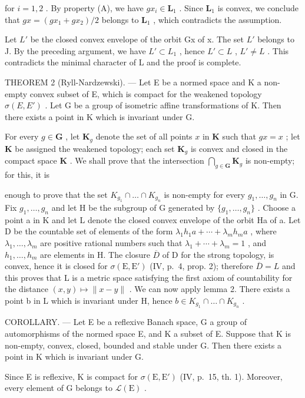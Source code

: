 for \(i = 1, 2\) . By property (A), we have \(gx_{i} \in \mathbf{L}_{1}\) . Since \(\mathbf{L}_{1}\) is convex, we conclude that \(gx = (gx_{1} + gx_{2}) / 2\) belongs to \(\mathbf{L}_{1}\) , which contradicts the assumption.

Let \(L'\) be the closed convex envelope of the orbit Gx of x. The set \(L'\) belongs to J. By the preceding argument, we have \(L' \subset L_1\) , hence \(L' \subset L\) , \(L' \neq L\) . This contradicts the minimal character of L and the proof is complete.

THEOREM 2 (Ryll-Nardzewski). --- Let E be a normed space and K a non-empty convex subset of E, which is compact for the weakened topology \(\sigma(E, E')\) . Let G be a group of isometric affine transformations of K. Then there exists a point in K which is invariant under G.

For every \(g \in \mathbf{G}\) , let \(\mathbf{K}_g\) denote the set of all points \(x\) in \(\mathbf{K}\) such that \(gx = x\) ; let \(\mathbf{K}\) be assigned the weakened topology; each set \(\mathbf{K}_g\) is convex and closed in the compact space \(\mathbf{K}\) . We shall prove that the intersection \(\bigcap_{g \in \mathbf{G}} \mathbf{K}_g\) is non-empty; for this, it is

enough to prove that the set \(K_{g_{1}} \cap \ldots \cap K_{g_{n}}\) is non-empty for every \(g_{1}, \ldots, g_{n}\) in G. Fix \(g_{1}, \ldots, g_{n}\) and let H be the subgroup of G generated by \(\{g_{1}, \ldots, g_{n}\}\) . Choose a point a in K and let L denote the closed convex envelope of the orbit Ha of a. Let D be the countable set of elements of the form \(\lambda_{1}h_{1}a + \cdots + \lambda_{m}h_{m}a\) , where \(\lambda_{1}, \ldots, \lambda_{m}\) are positive rational numbers such that \(\lambda_{1} + \cdots + \lambda_{m} = 1\) , and \(h_{1}, \ldots, h_{m}\) are elements in H. The closure \(\overline{D}\) of D for the strong topology, is convex, hence it is closed for \(\sigma(\mathrm{E}, \mathrm{E}')\) (IV, p.~4, prop. 2); therefore \(\overline{D} = L\) and this proves that L is a metric space satisfying the first axiom of countability for the distance \((x, y) \mapsto \|x - y\|\) . We can now apply lemma 2. There exists a point b in L which is invariant under H, hence \(b \in K_{g_{1}} \cap \ldots \cap K_{g_{n}}\) .

COROLLARY. --- Let E be a reflexive Banach space, G a group of automorphisms of the normed space E, and K a subset of E. Suppose that K is non-empty, convex, closed, bounded and stable under G. Then there exists a point in K which is invariant under G.

Since E is reflexive, K is compact for \(\sigma(\mathrm{E}, \mathrm{E}')\) (IV, p.~15, th. 1). Moreover, every element of G belongs to \(\mathcal{L}(\mathrm{E})\) .

